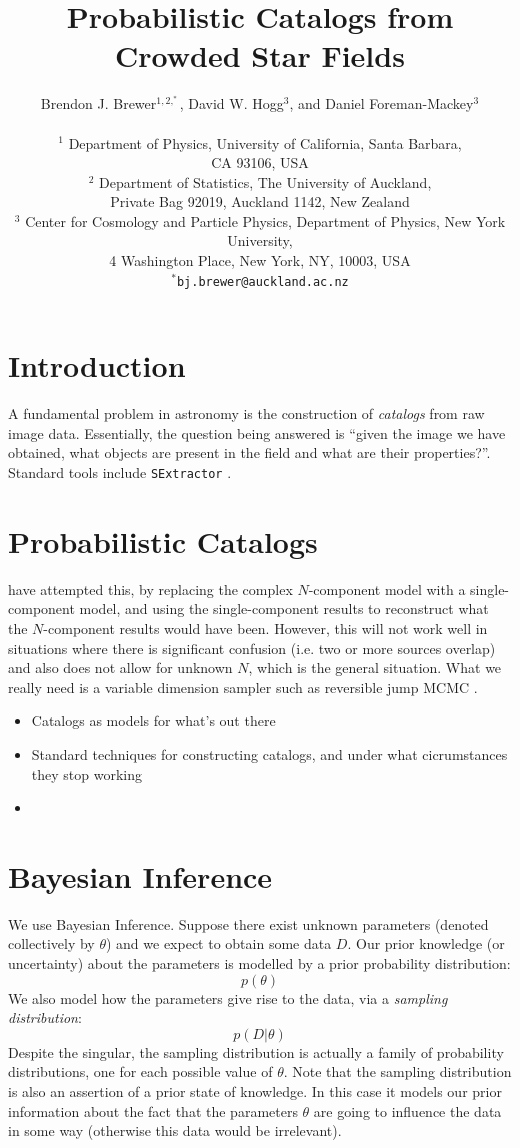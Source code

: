 \documentclass[letterpaper, 11pt]{article}
\title{Probabilistic Catalogs from Crowded Star Fields}
\author{Brendon J. Brewer$^{1, 2, ^*}$, David W. Hogg$^{3}$,
and Daniel Foreman-Mackey$^{3}$ \\
\\
\small
$^1$ Department of Physics, University of California, Santa Barbara,\\
\small
CA 93106, USA \\
\small
$^2$ Department of Statistics, The University of Auckland,\\
\small
Private Bag 92019, Auckland 1142, New Zealand \\
\small
$^3$ Center for Cosmology and Particle Physics, Department of Physics,
New York University,\\
\small
4 Washington Place, New York, NY, 10003, USA\\
\small
$^*$\texttt{bj.brewer@auckland.ac.nz}
}
\begin{document}
\maketitle

\section{Introduction}

A fundamental problem in astronomy is the construction of {\it catalogs} from
raw image data. Essentially, the question being answered is ``given the image
we have obtained, what objects are present in the field and what are their
properties?''. Standard tools include \texttt{SExtractor} \citep{sextractor}.

\section{Probabilistic Catalogs}


\citet{2011MNRAS.415.3462F} have attempted this, by replacing the complex
$N$-component model with a single-component model, and using the
single-component
results to reconstruct what the $N$-component results would have been. However,
this will not work well in situations where there is significant confusion
(i.e. two or more sources overlap) and also does not allow for unknown $N$,
which is the general situation. What we really need is a variable dimension
sampler such as reversible jump MCMC \citep{rjmcmc}.

\begin{itemize}
\item Catalogs as models for what's out there \\
\item Standard techniques for constructing catalogs, and under what
cicrumstances they stop working \\
\item 
\end{itemize}

\section{Bayesian Inference}
We use Bayesian Inference. Suppose there exist unknown parameters (denoted
collectively by $\theta$) and we expect to obtain some data $D$. Our prior
knowledge (or uncertainty) about the parameters is modelled by a prior
probability distribution:
\begin{equation}
p(\theta)
\end{equation}
We also model how the parameters give rise to the data, via a {\it sampling
distribution}:
\begin{equation}
p(D|\theta)
\end{equation}
Despite the singular, the sampling distribution is actually a family of
probability distributions, one for each possible value of $\theta$. Note that
the sampling distribution is also an assertion of a prior state of knowledge.
In this case it models our prior information about the fact that the parameters
$\theta$ are going to influence the data in some way (otherwise this data
would be irrelevant).
\end{document}
